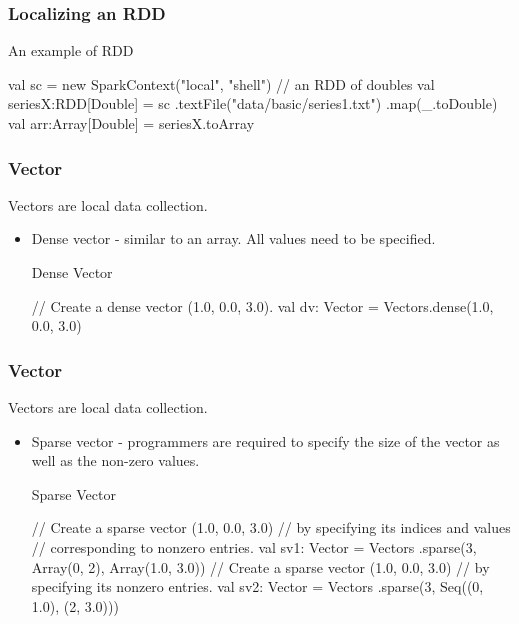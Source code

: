 \documentclass{beamer}
\newcommand{\beb}{\begin{exampleblock}}
\newcommand{\eeb}{\end{exampleblock}}
\begin{document}


\begin{frame}[fragile]
\frametitle{Localizing an RDD}

\beb{An example of RDD}
\begin{code}
val sc = new SparkContext("local", "shell")	
// an RDD of doubles 
val seriesX:RDD[Double] = sc
  .textFile("data/basic/series1.txt")
  .map(_.toDouble)
val arr:Array[Double] = seriesX.toArray
\end{code}
\eeb

\end{frame}




\begin{frame}[fragile]
\frametitle{Vector}

Vectors are local data collection.
\begin{itemize}
\item Dense vector - similar to an array. All values need to be specified.
\beb{Dense Vector}
\begin{code}
// Create a dense vector (1.0, 0.0, 3.0).
val dv: Vector = Vectors.dense(1.0, 0.0, 3.0)
\end{code}
\eeb
\end{itemize}
\end{frame}



\begin{frame}[fragile]
\frametitle{Vector}

Vectors are local data collection.
\begin{itemize}
\item Sparse vector - programmers are required to specify the size of
  the vector  as well as the non-zero values.
\beb{Sparse Vector}
\begin{code}
// Create a sparse vector (1.0, 0.0, 3.0) 
// by specifying its indices and values 
// corresponding to nonzero entries.
val sv1: Vector = Vectors
  .sparse(3, Array(0, 2), Array(1.0, 3.0))
// Create a sparse vector (1.0, 0.0, 3.0) 
// by specifying its nonzero entries.
val sv2: Vector = Vectors
  .sparse(3, Seq((0, 1.0), (2, 3.0)))
\end{code}
\eeb  
\end{itemize}
\end{frame}
\end{document}
